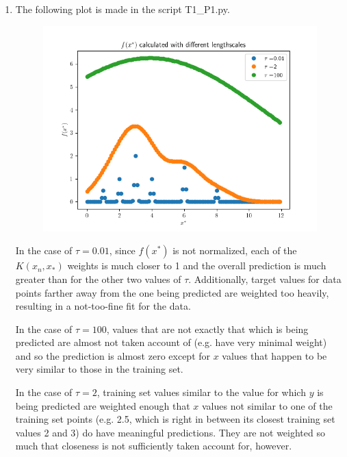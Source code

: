 \documentclass[submit]{harvardml}
\begin{document}
\begin{enumerate}
  \newpage
  \item 
  
  The following plot is made in the script T1\_P1.py.
  
  \begin{figure}[h]
  \includegraphics[scale=0.8]{P1}
  \centering
  \end{figure}

  In the case of $\tau=0.01$, since $f(x^*)$ is not normalized, each of the $K(x_n, x_*)$ weights
  is much closer to 1 and the overall prediction is much greater than for the other two values of 
  $\tau$. Additionally, target values for data points farther away from the one being 
  predicted are weighted too heavily, resulting in a not-too-fine fit for the data.

  In the case of $\tau=100$, values that are not exactly that which is being predicted are almost
  not taken account of (e.g. have very minimal weight) and so the prediction is almost zero except 
  for $x$ values that happen to be very similar to those in the training set.
  
  In the case of $\tau=2$, training set values similar to the value for which $y$ is being predicted
  are weighted enough that $x$ values not similar to one of the training set points (e.g.
  2.5, which is right in between its closest training set values 2 and 3) do have meaningful
  predictions. They are not weighted so much that closeness is not sufficiently taken account for,
  however.



\end{enumerate}
\end{document}
